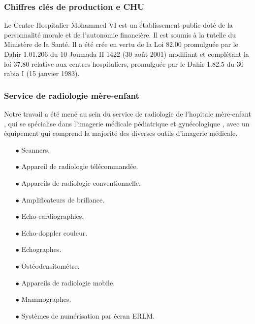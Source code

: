             \subsubsection{Chiffres clés de production e CHU}
            Le Centre Hospitalier Mohammed VI est un établissement public doté de la personnalité morale et de l’autonomie financière. Il est soumis à la tutelle du Ministère de la Santé. Il a été crée en vertu de la Loi 82.00 promulguée par le Dahir 1.01.206 du 10 Joumada II 1422 (30 août 2001) modifiant et complétant la loi 37.80 relative aux centres hospitaliers, promulguée par le Dahir 1.82.5 du 30 rabia I (15 janvier 1983).

        
            \subsubsection{Service de radiologie mère-enfant}\label{service_radio}
            Notre travail a été mené au sein du service de radiologie de l’hopitale mère-enfant , qui se spécialise dans l’imagerie médicale pédiatrique et gynécologique , avec un équipement qui comprend la majorité des diverses outils d’imagerie médicale.
            
            \vspace{3mm}
            \begin{multicols}{2}
                \begin{itemize}
                    \item[$\bullet$] Scanners.
                    \item[$\bullet$] Appareil de radiologie télécommandée.
                    \item[$\bullet$] Appareils de radiologie conventionnelle.
                    \item[$\bullet$] Amplificateurs de brillance.
                    \item[$\bullet$] Echo-cardiographies.
                    \item[$\bullet$] Echo-doppler couleur.
                    \item[$\bullet$] Echographes.
                    \item[$\bullet$] Ostéodensitométre.
                    \item[$\bullet$] Appareils de radiologie mobile.
                    \item[$\bullet$] Mammographes.
                    \item[$\bullet$] Systèmes de numérisation par écran ERLM.
                \end{itemize} 
            \end{multicols} 
            \vspace{3mm}

